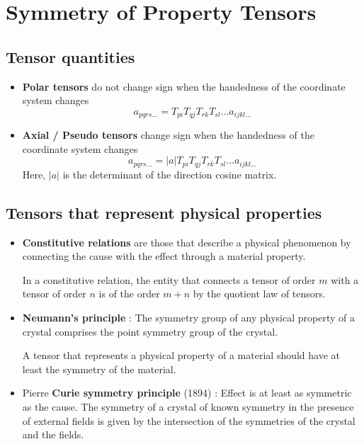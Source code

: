 \chapter{Symmetry of Property Tensors}
\label{ch:symprop}


\section{Tensor quantities}

\begin{itemize}
\item {\bf Polar tensors} do not change sign when the handedness of the coordinate system changes
$$ a_{pqrs...} = T_{pi} T_{qj} T_{rk} T_{sl} ... a_{ijkl...}$$
\item {\bf Axial / Pseudo tensors} change sign when the handedness of the coordinate system changes
$$ a_{pqrs...} = \left| a \right| T_{pi} T_{qj} T_{rk} T_{sl} ... a_{ijkl...}$$
Here, $\left| a \right|$ is the determinant of the direction cosine matrix.
\end{itemize}

\section{Tensors that represent physical properties}

\begin{itemize}

\item
{\bf Constitutive relations}  are those that describe a physical phenomenon by connecting the cause with the effect through a material property.

In a constitutive relation, the entity that connects a tensor of order $m$ with a tensor of order $n$ is of the order $m+n$ by the quotient law of tensors. 

\item
{\bf Neumann's principle}  : The symmetry group of any physical property of a crystal comprises the point symmetry group of the crystal.

A tensor that represents a physical property of a material should have at least the symmetry of the material.

\item
Pierre {\bf Curie symmetry principle} (1894) : Effect is at least as symmetric as the cause. The symmetry of a crystal of known symmetry in the presence of external fields is given by the intersection of the symmetries of the crystal and the fields.

\end{itemize}


